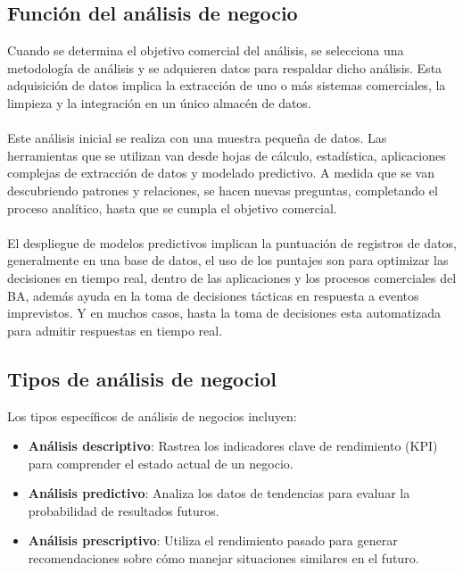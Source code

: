 \documentclass[twoside,twocolumn]{article}
\begin{document}
\subsection{Función del análisis de negocio}
Cuando se determina el objetivo comercial del análisis, se selecciona una metodología de análisis y se adquieren datos para respaldar dicho análisis.  Esta adquisición de datos implica la extracción de uno o más sistemas comerciales, la limpieza y la integración en un único almacén de datos.
\\ \\
Este análisis inicial se realiza con una muestra pequeña de datos.  Las herramientas que se utilizan van desde hojas de cálculo, estadística, aplicaciones complejas de extracción de datos y modelado predictivo. A medida que se van descubriendo patrones y relaciones, se hacen nuevas preguntas, completando el proceso analítico, hasta que se cumpla el objetivo comercial.
\\ \\
El despliegue de modelos predictivos implican la puntuación de registros de datos, generalmente en una base de datos, el uso de los puntajes son para optimizar las decisiones en tiempo real, dentro de las aplicaciones y los procesos comerciales del BA, además ayuda en la toma de decisiones tácticas en respuesta a eventos imprevistos.  Y en muchos casos, hasta la toma de decisiones esta automatizada para admitir respuestas en tiempo real.
\subsection{Tipos de análisis de negociol}
Los tipos específicos de análisis de negocios incluyen:

\begin{itemize}	

	\item \textbf{Análisis descriptivo}: Rastrea los indicadores clave de rendimiento (KPI) para comprender el estado actual de un negocio.
	\item \textbf{Análisis predictivo}: Analiza los datos de tendencias para evaluar la probabilidad de resultados futuros.
	\item \textbf{Análisis prescriptivo}: Utiliza el rendimiento pasado para generar recomendaciones sobre cómo manejar situaciones similares en el futuro.

\end{itemize} 


\end{document}
